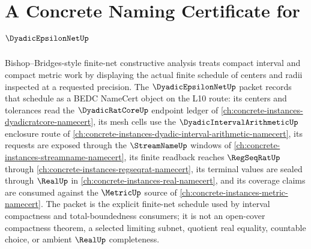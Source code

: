 \chapter{A Concrete Naming Certificate for $\DyadicEpsilonNetUp$}
\label{ch:concrete-instances-dyadic-epsilon-net-namecert}

Bishop--Bridges-style finite-net constructive analysis treats compact interval and compact metric work by displaying the actual finite schedule of centers and radii inspected at a requested precision. The $\DyadicEpsilonNetUp$ packet records that schedule as a BEDC NameCert object on the L10 route: its centers and tolerances read the $\DyadicRatCoreUp$ endpoint ledger of \autoref{ch:concrete-instances-dyadicratcore-namecert}, its mesh cells use the $\DyadicIntervalArithmeticUp$ enclosure route of \autoref{ch:concrete-instances-dyadic-interval-arithmetic-namecert}, its requests are exposed through the $\StreamNameUp$ windows of \autoref{ch:concrete-instances-streamname-namecert}, its finite readback reaches $\RegSeqRatUp$ through \autoref{ch:concrete-instances-regseqrat-namecert}, its terminal values are sealed through $\RealUp$ in \autoref{ch:concrete-instances-real-namecert}, and its coverage claims are consumed against the $\MetricUp$ source of \autoref{ch:concrete-instances-metric-namecert}. The packet is the explicit finite-net schedule used by interval compactness and total-boundedness consumers; it is not an open-cover compactness theorem, a selected limiting subnet, quotient real equality, countable choice, or ambient $\RealUp$ completeness.


